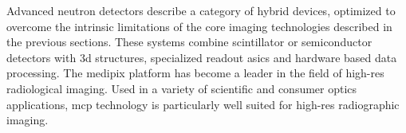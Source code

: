 \documentclass[../../../main.tex]{subfiles}
\begin{document}
%
    \Xsubsection%
    Advanced neutron detectors describe a category of hybrid devices, optimized to overcome the intrinsic limitations of the core imaging technologies described in the previous sections.
    These systems combine scintillator or semiconductor detectors with \gls{3d} structures, specialized readout \glspl{asic} and hardware based data processing. 
    The \gls{medipix} platform has become a leader in the field of \gls{high-res} radiological imaging.
    Used in a variety of scientific and consumer optics applications, \gls{mcp} technology is particularly well suited for \gls{high-res} radiographic imaging.
\end{document}
